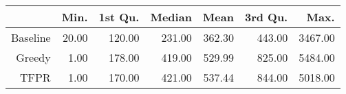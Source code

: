 \begin{table}[ht]
\centering
\begin{tabular}{rrrrrrr}
  \hline
 & Min. & 1st Qu. & Median & Mean & 3rd Qu. & Max. \\ 
  \hline
Baseline & 20.00 & 120.00 & 231.00 & 362.30 & 443.00 & 3467.00 \\ 
  Greedy & 1.00 & 178.00 & 419.00 & 529.99 & 825.00 & 5484.00 \\ 
  TFPR & 1.00 & 170.00 & 421.00 & 537.44 & 844.00 & 5018.00 \\ 
   \hline
\end{tabular}
\end{table}
